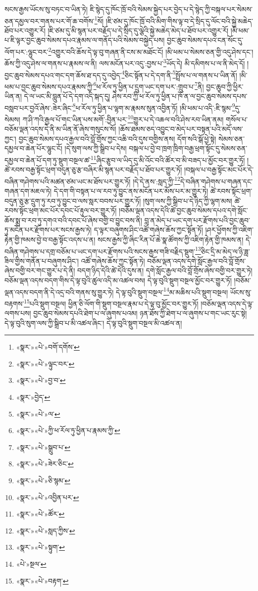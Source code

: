 སངས་རྒྱས་ཡོངས་སུ་བཏང་བ་ཡིན་ཏེ། ཇི་སྙེད་དུ་ཁོང་ཁྲོ་བའི་སེམས་སྐྱེད་པར་བྱེད་པ་དེ་སྙེད་ཀྱི་བསྐལ་པར་སེམས་ཅན་དམྱལ་བར་གནས་པར་གོ་ཆ་བགོས་\footnote{«སྣར་»«པེ་»བགོ་དགོས་}སོ། །ཇི་ཙམ་དུ་ཁོང་ཁྲོ་བའི་མིག་གིས་ལྟ་བ་དེ་སྲིད་དུ་ལོང་བའི་སྐྱེ་མཆེད་ཐོབ་པར་འགྱུར་རོ། །ཇི་ཙམ་དུ་མི་སྙན་པར་བརྗོད་པ་དེ་སྲིད་དུ་ལྕེའི་སྐྱེ་མཆེད་མེད་པ་ཐོབ་པར་འགྱུར་རོ། །མི་ཕམ་པ་ཇི་ལྟར་བྱང་ཆུབ་སེམས་དཔའ་རྣམས་ལ་གནོད་པའི་སེམས་བསྐྱེད་པས། བྱང་ཆུབ་སེམས་དཔའ་ངན་སོང་དུ་ལོག་པར་:ལྷུང་བར་\footnote{«སྣར་»«པེ་»ལྟུང་བར་}འགྱུར་བའི་ཆོས་དེ་ལྟ་བུ་གཞན་ནི་ངས་མ་མཐོང་ངོ། །མི་ཕམ་པ་སེམས་ཅན་གྱི་འདུ་ཤེས་དང་། ཆོས་ཀྱི་འདུ་ཤེས་ལ་གནས་པ་རྣམས་ལ་ནི། ལས་མངོན་པར་འདུ་:བྱས་པ་\footnote{«སྣར་»«པེ་»བྱ་བ་}ཡོད་དེ། མི་དམིགས་པ་ལ་ནི་མེད་དོ། །བྱང་ཆུབ་སེམས་དཔའ་གང་དག་ཆོས་ཐ་དད་དུ་འབྱེད་\footnote{«སྣར་»བྱེད་}ཅིང་སྟོན་པ་དེ་དག་ནི་\footnote{«སྣར་»«པེ་»ལ་}སྤྲོས་པ་ལ་གནས་པ་ཡིན་ནོ། །མི་ཕམ་པ་བྱང་ཆུབ་སེམས་དཔའ་རྣམས་ཀྱི་\footnote{«སྣར་»«པེ་»ཀྱི་ཕ་རོལ་ཏུ་ཕྱིན་པ་རྣམས་ཀྱི་}ཕ་རོལ་ཏུ་ཕྱིན་པ་དྲུག་ཡང་དག་པར་:གྲུབ་པ་\footnote{«སྣར་»«པེ་»སྒྲུབ་པ་}ནི། བྱང་ཆུབ་ཀྱི་ཕྱིར་ཡིན་ན། དེ་ལ་ཡང་མི་བླུན་པོ་དེ་དག་འདི་སྐད་དུ། ཤེས་རབ་ཀྱི་ཕ་རོལ་ཏུ་ཕྱིན་པ་ཁོ་ན་ལ་བྱང་ཆུབ་སེམས་དཔས་བསླབ་པར་བྱའོ་ཞེས་:ཟེར་ཞིང་\footnote{«སྣར་»«པེ་»ཟེར་ཅིང་}ཕ་རོལ་ཏུ་ཕྱིན་པ་ལྷག་མ་རྣམས་སུན་འབྱིན་ཏོ། །མི་ཕམ་པ་འདི་:ཇི་སྙམ་\footnote{«སྣར་»«པེ་»ཅི་སྙམ་}དུ་སེམས། ཀ་ཤི་ཀའི་རྒྱལ་པོ་གང་ཡིན་པས་མགོ་:བྱིན་པར་\footnote{«སྣར་»«པེ་»འབྱིན་པར་}གྱུར་པ་དེ་འཆལ་བའི་ཤེས་རབ་ཡིན་ནམ། གསོལ་པ་བཅོམ་ལྡན་འདས་དེ་ནི་མ་ཡིན་ནོ་ཞེས་གསུངས་སོ། །ཆོས་ཐམས་ཅད་འབྱུང་བ་མེད་པར་བསྟན་པའི་མདོ་ལས་ཀྱང་། བྱང་ཆུབ་སེམས་དཔའ་རྒྱལ་བའི་བློ་གྲོས་ཀྱང་འཆི་བའི་དུས་བགྱིས་ནས། དོག་སའི་སྒོ་ཕྱེ་སྟེ། སེམས་ཅན་དམྱལ་བ་ཆེན་པོར་ལྷུང་ངོ། །དེ་སུག་ལས་ཀྱི་སྒྲིབ་པ་དེས། བསྐལ་པ་བྱེ་བ་ཁྲག་ཁྲིག་བརྒྱ་ཕྲག་སྟོང་དུ་སེམས་ཅན་དམྱལ་བ་ཆེན་པོ་དག་ཏུ་སྡུག་བསྔལ་ཚ་\footnote{«སྣར་»«པེ་»ཚོར་}ཞིང་རྩུབ་ལ་ཡིད་དུ་མི་འོང་བའི་ཚོར་བ་མི་བཟད་པ་མྱོང་བར་གྱུར་ཏོ། །ཚེ་རབས་བརྒྱ་སྟོང་ཕྲག་བདུན་ཅུ་རྩ་བཞིར་མི་སྙན་པར་བརྗོད་པ་ཐོབ་པར་གྱུར་ཏོ། །བསྐལ་པ་བརྒྱ་སྟོང་མང་པོར་དེ་བཞིན་གཤེགས་པའི་མཚན་ཙམ་ཡང་མ་ཐོས་པར་གྱུར་ཏོ། །དེ་དེ་ནས་:སླད་ཀྱི་\footnote{«སྣར་»«པེ་»སླད་ཀྱིས་}དེ་བཞིན་གཤེགས་པ་གཞན་དང་གཞན་དག་མཇལ་ཏེ། དེ་དག་གི་བསྟན་པ་ལ་རབ་ཏུ་བྱུང་ནས་མངོན་པར་མོས་པར་མ་གྱུར་ཏེ། ཚེ་རབས་སྟོང་ཕྲག་བདུན་ཅུ་རྩ་དྲུག་ཏུ་རབ་ཏུ་བྱུང་བ་ལས་སླར་བབས་པར་གྱུར་ཏོ། །སུག་ལས་ཀྱི་སྒྲིབ་པ་དེ་ཉིད་ཀྱི་ལྷག་མས། ཚེ་རབས་སྟོང་ཕྲག་མང་པོར་དབང་པོ་རྟུལ་བར་གྱུར་ཏོ། །བཅོམ་ལྡན་འདས་དེའི་ཚེ་བྱང་ཆུབ་སེམས་དཔའ་དགེ་སློང་ཆོས་སྨྲ་བ་རབ་ཏུ་དགའ་བའི་དབང་པོ་ཞེས་བགྱི་བ་བྱུང་བས་ནི། བླ་ན་མེད་པ་ཡང་དག་པར་རྫོགས་པའི་བྱང་ཆུབ་ཏུ་མངོན་པར་རྫོགས་པར་སངས་རྒྱས་ཏེ། ད་ལྟར་བཞུགས་ཤིང་འཚོ་གཞེས་ཆོས་ཀྱང་སྟོན་ཏོ། །ཤར་ཕྱོགས་ཀྱི་འཇིག་རྟེན་གྱི་ཁམས་བྱེ་བ་བརྒྱ་སྟོང་འདས་པ་ན། སངས་རྒྱས་ཀྱི་ཞིང་རིན་པོ་ཆེ་སྣ་ཚོགས་ཀྱི་འཇིག་རྟེན་གྱི་ཁམས་ན། དེ་བཞིན་གཤེགས་པ་དགྲ་བཅོམ་པ་ཡང་དག་པར་རྫོགས་པའི་སངས་རྒྱས་གཟི་བརྗིད་སྡུག་\footnote{«སྣར་»«པེ་»སྟུག་}ཅིང་དྲི་མ་མེད་ལ་ཉི་ཟླ་ཟིལ་གྱིས་གནོན་པ་བཞུགས་ཤིང་། འཚོ་གཞེས་ཆོས་ཀྱང་སྟོན་ཏེ། བཅོམ་ལྡན་འདས་དགེ་སློང་རྒྱལ་བའི་བློ་གྲོས་ཞེས་བགྱི་བར་གང་གྱུར་པ་དེ་ནི། བདག་ཉིད་དེའི་ཚེ་དེའི་དུས་ན། དགེ་སློང་རྒྱལ་བའི་བློ་གྲོས་ཞེས་བགྱི་བར་གྱུར་ཏེ། བཅོམ་ལྡན་འདས་བདག་གིས་དེ་ལྟ་བུའི་ཚུལ་འདི་མ་འཚལ་བས། དེ་ལྟ་བུའི་སྡུག་བསྔལ་མྱོང་བར་གྱུར་ཏོ། །བཅོམ་ལྡན་འདས་བདག་ནི་དེ་འདྲ་བའི་གནས་སུ་གྱུར་ཏེ། དེ་ལྟ་བུའི་སྡུག་བསྔལ་\footnote{«པེ་»སྔལ་}མ་མཆིས་པའི་སྡུག་བསྔལ། ཡོངས་སུ་བརྟགས་\footnote{«སྣར་»«པེ་»བརྟག་}པའི་སྡུག་བསྔལ། ཕྱིན་ཅི་ལོག་གི་སྡུག་བསྔལ་རྣམ་པ་དེ་ལྟ་བུ་མྱོང་བར་གྱུར་ཏོ། །བཅོམ་ལྡན་འདས་དེ་ལྟ་ལགས་པས། བྱང་ཆུབ་སེམས་དཔའི་ཐེག་པ་ལ་ཞུགས་པའམ། ཉན་ཐོས་ཀྱི་ཐེག་པ་ལ་ཞུགས་པ་གང་ཡང་རུང་སྟེ། དེ་ལྟ་བུའི་སུག་ལས་ཀྱི་སྒྲིབ་པ་མི་འཚལ་ཞིང་། དེ་ལྟ་བུའི་སྡུག་བསྔལ་མི་འཚལ་ན། 